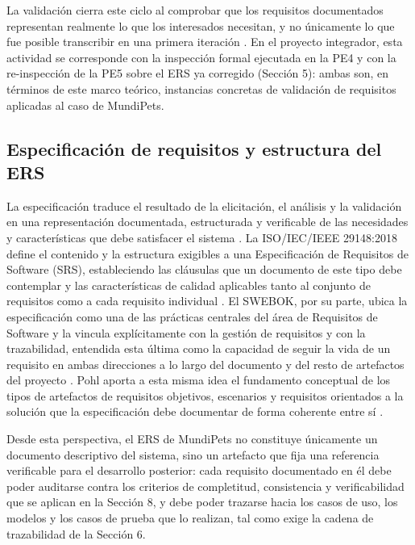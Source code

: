 \documentclass[journal,onecolumn]{IEEEtran}
\begin{document}
	La validación cierra este ciclo al comprobar que los requisitos documentados representan realmente lo
	que los interesados necesitan, y no únicamente lo que fue posible transcribir en una primera
	iteración \cite{ieee29148,pohl2025}. En el proyecto integrador, esta actividad se corresponde con la
	inspección formal ejecutada en la PE4 y con la re-inspección de la PE5 sobre el ERS ya corregido
	(Sección 5): ambas son, en términos de este marco teórico, instancias concretas de validación de
	requisitos aplicadas al caso de MundiPets.
	
	\subsection*{Especificación de requisitos y estructura del ERS}
	
	La especificación traduce el resultado de la elicitación, el análisis y la validación en una
	representación documentada, estructurada y verificable de las necesidades y características que debe
	satisfacer el sistema \cite{ieee29148}. La ISO/IEC/IEEE 29148:2018 define el contenido y la estructura
	exigibles a una Especificación de Requisitos de Software (SRS), estableciendo las cláusulas que un
	documento de este tipo debe contemplar y las características de calidad aplicables tanto al conjunto
	de requisitos como a cada requisito individual \cite{ieee29148}. El SWEBOK, por su parte, ubica la
	especificación como una de las prácticas centrales del área de Requisitos de Software y la vincula
	explícitamente con la gestión de requisitos y con la trazabilidad, entendida esta última como la
	capacidad de seguir la vida de un requisito en ambas direcciones a lo largo del documento y del resto
	de artefactos del proyecto \cite{swebok2024}. Pohl aporta a esta misma idea el fundamento conceptual
	de los tipos de artefactos de requisitos objetivos, escenarios y requisitos orientados a la
	solución que la especificación debe documentar de forma coherente entre sí \cite{pohl2025}.
	
	Desde esta perspectiva, el ERS de MundiPets no constituye únicamente un documento descriptivo del
	sistema, sino un artefacto que fija una referencia verificable para el desarrollo posterior: cada
	requisito documentado en él debe poder auditarse contra los criterios de completitud, consistencia y
	verificabilidad que se aplican en la Sección 8, y debe poder trazarse hacia los casos de uso, los
	modelos y los casos de prueba que lo realizan, tal como exige la cadena de trazabilidad de la
	Sección 6.
	
\end{document}
